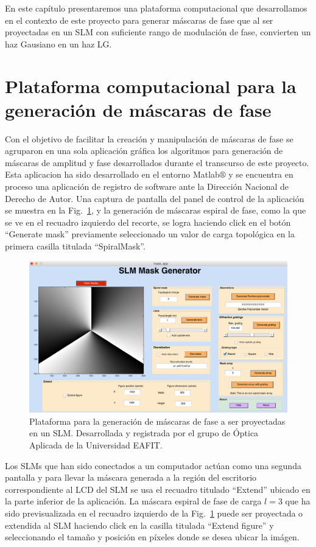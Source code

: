 En este capítulo presentaremos una plataforma computacional que
desarrollamos en el contexto de este proyecto para
generar máscaras de fase que al ser  proyectadas en un SLM con
suficiente rango de modulación de fase, convierten
un haz Gausiano en un haz LG.

\section{Plataforma computacional para la generación de máscaras de fase}

Con el objetivo de facilitar la creación y manipulación de máscaras de
fase se agruparon en una sola aplicación gráfica los algoritmos para
generación de máscaras de amplitud 
y fase desarrollados durante el transcurso de este proyecto. Esta aplicacion
ha sido desarrollado en el entorno Matlab$\circledR$ y se encuentra en
proceso una aplicación de registro de software ante la Dirección
Nacional de Derecho de Autor.
Una captura de pantalla del panel de control de la aplicación se muestra en la Fig.~\ref{fig:mask_app}, y la
generación de máscaras espiral de fase, como la que se ve en el
recuadro izquierdo del recorte, se logra haciendo click en el botón
``Generate mask'' previamente seleccionado un valor de
carga topológica en la primera casilla titulada ``SpiralMask''. 
\begin{figure}[h!]
\centering
\includegraphics[scale=0.4]{mask_app.png}
\caption[Plataforma para la generación de máscaras de fase]{Plataforma
  para la generación de máscaras de fase a ser proyectadas en un SLM. Desarrollada y registrada por el
  grupo de Óptica Aplicada de la Universidad EAFIT.} 
\label{fig:mask_app}
\end{figure}

Los SLMs que han sido conectados a un computador actúan como una segunda
pantalla y para llevar la máscara generada a la región del escritorio
correspondiente al LCD del SLM se usa el recuadro titulado ``Extend'' ubicado
en la parte inferior de la aplicación. La máscara espiral de fase de
carga $l=3$ que ha sido previsualizada en el recuadro izquierdo de la
Fig.~\ref{fig:mask_app} puede
ser proyectada o extendida al SLM haciendo click en la casilla
titulada ``Extend figure'' y seleccionando el tamaño y posición en 
píxeles donde se desea ubicar la imágen.  

